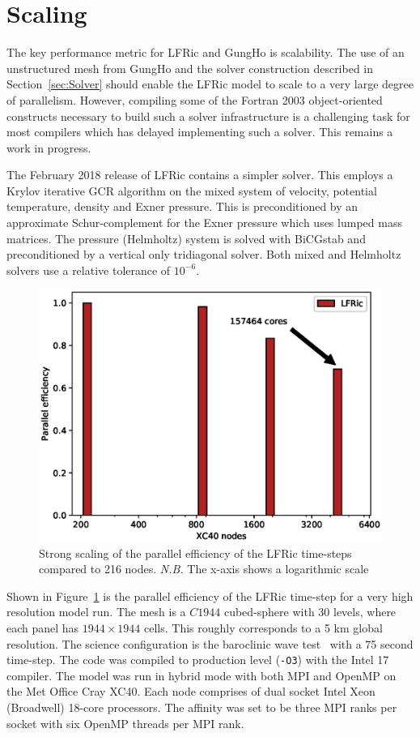 \documentclass[review,times]{elsarticle}
\begin{document}
\section{\label{sec:scal}Scaling}

The key performance metric for
LFRic and GungHo is scalability. The use of an unstructured mesh from
GungHo and the solver construction described in
Section~\ref{sec:Solver} should enable the LFRic model to scale to a
very large degree of parallelism. However, compiling some of the
Fortran 2003 object-oriented constructs necessary to build such a solver
infrastructure is a challenging task for most compilers which has
delayed implementing such a solver. This remains a work in progress.

The February 2018 release of LFRic contains a simpler
solver. This employs a Krylov iterative GCR algorithm on the mixed
system of velocity, potential temperature, density and Exner
pressure. This is preconditioned by an approximate Schur-complement
for the Exner pressure which uses lumped mass matrices. The pressure
(Helmholtz) system is solved with BiCGstab and preconditioned by a
vertical only tridiagonal solver. Both mixed and Helmholtz solvers use
a relative tolerance of $10^{-6}$.

\begin{figure}
  \begin{center}
    \includegraphics[width=0.85\linewidth]{Fig7_scale.eps}
    \caption{\label{fig:scale_PE}Strong scaling of the parallel efficiency of the LFRic 
      time-steps compared to 216 nodes. {\em N.B.} The x-axis shows a
      logarithmic scale}
  \end{center}
\end{figure}

Shown in Figure~\ref{fig:scale_PE} is 
the parallel efficiency of the LFRic time-step for a very high 
resolution model run. The mesh is a $C1944$ cubed-sphere with 30 
levels, where each panel has $1944 \times 1944$ cells. This roughly corresponds 
to a 5 km global resolution. The science configuration is the baroclinic wave 
test~\cite{qj.2241} with a 75 second time-step. The code was compiled 
to production level (\verb+-O3+) with the Intel 17 compiler. The model 
was run in hybrid mode with both MPI and OpenMP on the Met Office Cray 
XC40. Each node comprises of dual socket Intel Xeon (Broadwell) 
18-core processors. The affinity was set to be three MPI ranks per 
socket with six OpenMP threads per MPI rank. 
\end{document}
